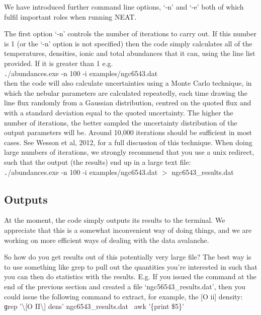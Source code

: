 \documentclass[11pt,a4paper]{article}
\begin{document}
We have introduced further command line options, `-n' and `-e' both of which fulfil important roles when running {\sc NEAT}.

The first option `-n' controls the number of iterations to carry out.  If this number is 1 (or the `-n' option is not specified) then the code simply calculates all of the temperatures, densities, ionic and total abundances that it can, using the line list provided. If it is greater than 1 e.g.
\\

{\texttt ./abundances.exe -n 100 -i examples/ngc6543.dat}
\\

then the code will also calculate uncertainties using a Monte Carlo technique, in which the nebular parameters are calculated repeatedly, each time drawing the line flux randomly from a Gaussian distribution, centred on the quoted flux and with a standard deviation equal to the quoted uncertainty. The higher the number of iterations, the better sampled the uncertainty distribution of the output parameters will be.  Around 10,000 iterations should be sufficient in most cases. See Wesson et al, 2012, for a full discussion of this technique. When doing large numbers of iterations, we strongly recommend that you use a unix redirect, such that the output (the results) end up in a large text file:
\\

{\texttt ./abundances.exe -n 100 -i examples/ngc6543.dat $>$ ngc6543\_results.dat}

\subsection{Outputs}

At the moment, the code simply outputs its results to the terminal. We appreciate that this is a somewhat inconvenient way of doing things, and we are working on more efficient ways of dealing with the data avalanche.

So how do you get results out of this potentially very large file? The best way is to use something like grep to pull out the quantities you're interested in such that you can then do statistics with the results. E.g. If you issued the command at the end of the previous section and created a file `ngc56543\_results.dat', then you could issue the following command to extract, for example, the [O {\sc ii}] density:
\\

{\texttt grep '\textbackslash[O II\textbackslash] dens' ngc6543\_results.dat \textbar\ awk '\{print \$5\}' }
\\
\end{document}
